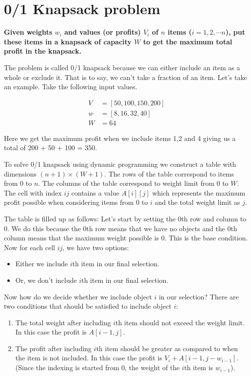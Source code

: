 \documentclass[a4paper,11pt]{book}
\begin{document}
\section{0/1 Knapsack problem}

\noindent \textbf{Given weights $w_i$ and values (or profits) $V_i$ of $n$ items ($i = 1,2,\cdots n$), put these items in a knapsack of capacity $W$ to get the maximum total profit in the knapsack.}

\vspace{3mm}

\noindent The problem is called 0/1 knapsack because we can either include an item as a whole or exclude it. That is to say, we can't take a fraction of an item. Let’s take an example. Take the following input values.

\begin{align*}
V &= [50,100,150,200]\\
w &= [8,16,32,40]\\
W &= 64
\end{align*}

\noindent Here we get the maximum profit when we include items 1,2 and 4 giving us a total of 200 + 50 + 100 = 350.

\noindent To solve 0/1 knapsack using dynamic programming we construct a table with dimensions $(n+1) \times (W+1)$. The rows of the table correspond to items from 0 to $n$. The columns of the table correspond to weight limit from 0 to $W$. The cell with index $ij$ contains a value $A[i][j]$ which represents the maximum profit possible when considering items from 0 to $i$ and the total weight limit as $j$.

\noindent The table is filled up as follows: Let's start by setting the 0th row and column to 0. We do this because the 0th row means that we have no objects and the 0th column means that the maximum weight possible is 0. This is the base condition. Now for each cell $ij$, we have two options:
\begin{itemize}
    \item Either we include $i$th item in our final selection.
    \item Or, we don't include $i$th item in our final selection.
\end{itemize}

\noindent Now how do we decide whether we include object $i$ in our selection? There are two conditions that should be satisfied to include object $i$:
\begin{enumerate}
\item The total weight after including $i$th item should not exceed the weight limit. In this case the profit is $A[i-1,j]$.
\item The profit after including $i$th item should be greater as compared to when the item is not included. In this case the profit is $V_i + A[i-1,j-w_{i-1}]$. (Since the indexing is started from 0, the weight of the $i$th item is $w_{i-1}$).
\end{enumerate}
\end{document}
